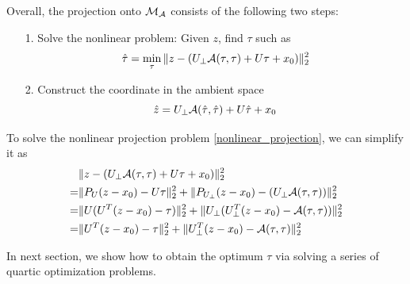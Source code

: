 \documentclass[aos,preprint]{imsart}
\theoremstyle{remark}
\begin{document}
Overall, the projection onto ${\cal M}_{\cal A}$ consists of the following two steps:
\begin{itemize}
\item[1.] Solve the nonlinear problem: Given $z$, find $\tau$ such as 
\begin{equation}\label{nonlinear_projection}
\hat{\tau} = \min_\tau \|z -  (U_{\perp} {\cal A} (\tau,\tau) + U \tau +x_0)\|_2^2
\end{equation}
\item[2.] Construct the coordinate in the ambient space
\[
\hat{z} = U_{\perp} {\cal A} (\hat{\tau},\hat{\tau}) + U \hat{\tau} +x_0
\]
\end{itemize}
To solve the nonlinear projection problem \eqref{nonlinear_projection}, we can simplify it as
\begin{equation}\label{simiplified_nonlinear}
\begin{aligned}
   &\|z -  (U_{\perp} {\cal A} (\tau,\tau) + U \tau +x_0)\|_2^2\\
 =&\|P_U(z-x_0)-U\tau\|_2^2+\|P_{U_{\perp}}(z-x_0)-(U_{\perp} {\cal A}(\tau,\tau))\|_2^2 \\
  =&\|U (U^T (z-x_0)-\tau)\|_2^2+\|U_\perp (U_{\perp}^T(z-x_0)- {\cal A}(\tau,\tau))\|_2^2 \\
 =&\|U^T (z-x_0)-\tau\|_2^2+\|U^T_{\perp}(z-x_0)- {\cal A} (\tau,\tau)\|_2^2
\end{aligned}
\end{equation}

In next section, we show how to obtain the optimum $\tau$ via solving a series of quartic optimization problems.
\end{document}
